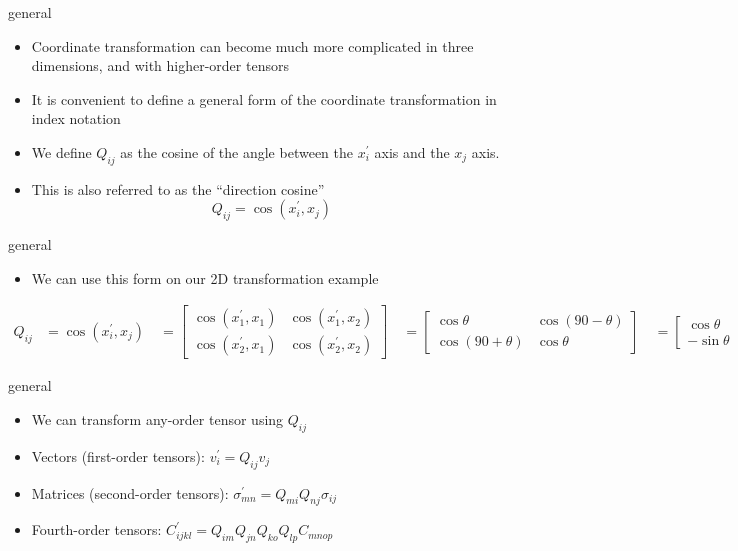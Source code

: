 \documentclass[
  letterpaper,
  ignorenonframetext,
  aspectratio=43,
  handout,
  12pt]{beamer}
\providecommand{\tightlist}{%
  \setlength{\itemsep}{0pt}\setlength{\parskip}{0pt}}
\providecommand{\tightlist}{%
\setlength{\itemsep}{0pt}\setlength{\parskip}{0pt}}
\begin{document}
\begin{frame}{general}
\protect\hypertarget{general}{}
\begin{itemize}
\tightlist
\item
  Coordinate transformation can become much more complicated in three
  dimensions, and with higher-order tensors
\item
  It is convenient to define a general form of the coordinate
  transformation in index notation
\item
  We define \(Q_{ij}\) as the cosine of the angle between the
  \(x_i^\prime\) axis and the \(x_j\) axis.
\item
  This is also referred to as the ``direction cosine''
  \[Q_{ij} = \cos(x_i^\prime, x_j)\]
\end{itemize}
\end{frame}

\begin{frame}{general}
\protect\hypertarget{general-1}{}
\begin{itemize}
\tightlist
\item
  We can use this form on our 2D transformation example
\end{itemize}

\[\begin{aligned}
Q_{ij} &= \cos (x_i^\prime, x_j)\ &= \begin{bmatrix}
\cos (x_1^\prime, x_1) & \cos (x_1^\prime, x_2)\\
\cos (x_2^\prime, x_1) & \cos (x_2^\prime, x_2)
\end{bmatrix}\ &= \begin{bmatrix}
\cos \theta & \cos (90-\theta)\\
\cos (90+\theta) & \cos \theta
\end{bmatrix} \ &= \begin{bmatrix}
\cos \theta & \sin \theta \\
-\sin \theta & \cos \theta
\end{bmatrix}\end{aligned}\]
\end{frame}

\begin{frame}{general}
\protect\hypertarget{general-2}{}
\begin{itemize}
\tightlist
\item
  We can transform any-order tensor using \(Q_{ij}\)
\item
  Vectors (first-order tensors): \(v_i^\prime = Q_{ij}v_j\)
\item
  Matrices (second-order tensors):
  \(\sigma_{mn}^\prime = Q_{mi}Q_{nj}\sigma_{ij}\)
\item
  Fourth-order tensors:
  \(C_{ijkl}^\prime = Q_{im}Q_{jn}Q_{ko}Q_{lp}C_{mnop}\)
\end{itemize}
\end{frame}
\end{document}
